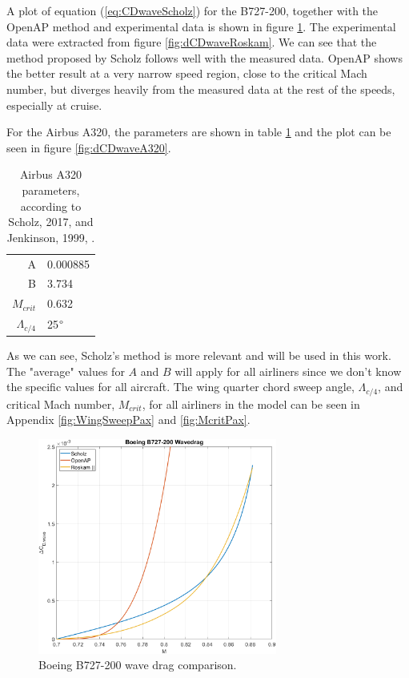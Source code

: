 \documentclass[english]{kththesis}
\begin{document}
A plot of equation (\ref{eq:CDwaveScholz}) for the B727-200, together with the OpenAP \cite{Sun2020} method and  experimental data is shown in figure \ref{fig:dCDwaveB727}. The experimental data were extracted from figure \ref{fig:dCDwaveRoskam}. We can see that the method proposed by Scholz follows well with the measured data. OpenAP shows the better result at a very narrow speed region, close to the critical Mach number, but diverges heavily from the measured data at the rest of the speeds, especially at cruise.

For the Airbus A320, the parameters are shown in table \ref{table:A320Param} and the plot can be seen in figure \ref{fig:dCDwaveA320}.

\begin{table}[h!]
\centering
\caption{Airbus A320 parameters, according to Scholz, 2017, \cite{Scholz2017} and Jenkinson, 1999, \cite{Jenkinson1999}.}
\begin{tabular}{ r l } 
\hline
A & 0.000885\\
B & 3.734\\
$M_{crit}$ & 0.632\\
$\Lambda_{c/4}$ & 25$\degree$\\
\hline
\end{tabular}
\label{table:A320Param}
\end{table}


As we can see, Scholz's method is more relevant and will be used in this work. The "average" values for $A$ and $B$ will apply for all airliners since we don't know the specific values for all aircraft. The wing quarter chord sweep angle, $\Lambda_{c/4}$, and critical Mach number, $M_{crit}$, for all airliners in the model can be seen in Appendix \ref{fig:WingSweepPax} and \ref{fig:McritPax}.

\begin{figure}[hb]
    \centering
    \includegraphics[width=0.7\textwidth]{Epictures/B727WaveDrag.png}
    \caption{Boeing B727-200 wave drag comparison.}
    \label{fig:dCDwaveB727}
\end{figure}
\end{document}
